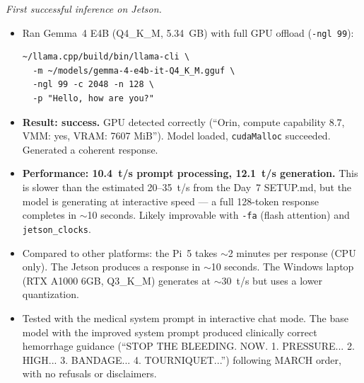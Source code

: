 \documentclass{article}
\theoremstyle{plain}
\theoremstyle{definition}
\theoremstyle{remark}
\begin{document}
\textit{First successful inference on Jetson.}
\begin{itemize}
\item Ran Gemma~4 E4B (Q4\_K\_M, 5.34~GB) with full GPU offload (\texttt{-ngl 99}):
\begin{verbatim}
~/llama.cpp/build/bin/llama-cli \
  -m ~/models/gemma-4-e4b-it-Q4_K_M.gguf \
  -ngl 99 -c 2048 -n 128 \
  -p "Hello, how are you?"
\end{verbatim}
\item \textbf{Result: success.} GPU detected correctly (``Orin, compute capability 8.7, VMM: yes, VRAM: 7607 MiB''). Model loaded, \texttt{cudaMalloc} succeeded. Generated a coherent response.
\item \textbf{Performance: 10.4~t/s prompt processing, 12.1~t/s generation.} This is slower than the estimated 20--35~t/s from the Day~7 SETUP.md, but the model is generating at interactive speed --- a full 128-token response completes in $\sim$10 seconds. Likely improvable with \texttt{-fa} (flash attention) and \texttt{jetson\_clocks}.
\item Compared to other platforms: the Pi~5 takes $\sim$2 minutes per response (CPU only). The Jetson produces a response in $\sim$10 seconds. The Windows laptop (RTX A1000 6GB, Q3\_K\_M) generates at $\sim$30~t/s but uses a lower quantization.
\item Tested with the medical system prompt in interactive chat mode. The base model with the improved system prompt produced clinically correct hemorrhage guidance (``STOP THE BLEEDING. NOW. 1. PRESSURE... 2. HIGH... 3. BANDAGE... 4. TOURNIQUET...'') following MARCH order, with no refusals or disclaimers.
\end{itemize}
\end{document}
